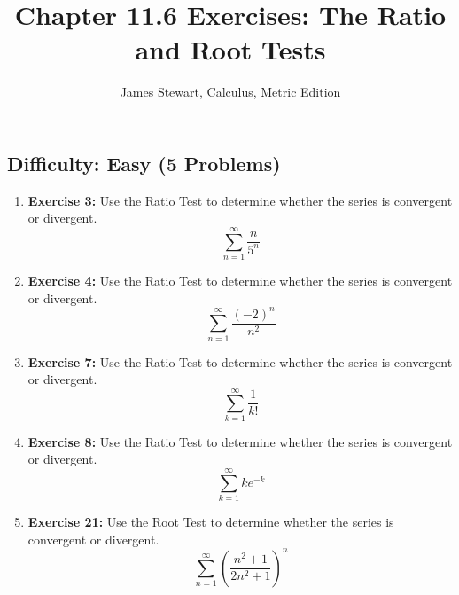 \documentclass{article}
\title{Chapter 11.6 Exercises: The Ratio and Root Tests}
\author{James Stewart, Calculus, Metric Edition}
\date{}
\begin{document}
\maketitle
\hrulefill %
\vspace{1em} %

\subsection*{Difficulty: Easy (5 Problems)}
\begin{enumerate}
    \item \textbf{Exercise 3:} Use the Ratio Test to determine whether the series is convergent or divergent.
    \[ \sum_{n=1}^{\infty} \frac{n}{5^n} \]
    
    \item \textbf{Exercise 4:} Use the Ratio Test to determine whether the series is convergent or divergent.
    \[ \sum_{n=1}^{\infty} \frac{(-2)^n}{n^2} \]
    
    \item \textbf{Exercise 7:} Use the Ratio Test to determine whether the series is convergent or divergent.
    \[ \sum_{k=1}^{\infty} \frac{1}{k!} \]
    
    \item \textbf{Exercise 8:} Use the Ratio Test to determine whether the series is convergent or divergent.
    \[ \sum_{k=1}^{\infty} k e^{-k} \]
    
    \item \textbf{Exercise 21:} Use the Root Test to determine whether the series is convergent or divergent.
    \[ \sum_{n=1}^{\infty} \left(\frac{n^2+1}{2n^2+1}\right)^n \]
\end{enumerate}

\hrulefill
\vspace{1em}

\end{document}
